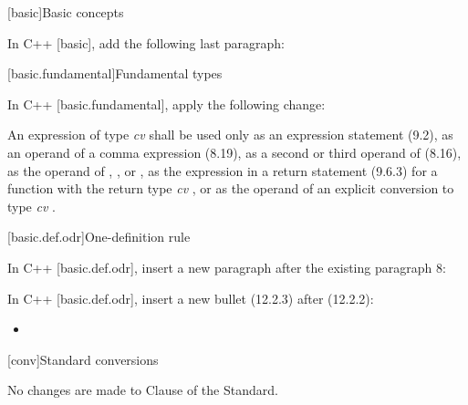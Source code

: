 
[basic]{Basic concepts}

\pnum
In C++ [basic], add the following last paragraph:

\begin{std.txt}
\end{std.txt}


[basic.fundamental]{Fundamental types}

\pnum
In C++ [basic.fundamental], apply the following change:

\begin{std.txt}
An expression of type \emph{cv}  shall be used only as an expression
statement (9.2), as an operand of a comma expression (8.19), as a second or
third operand of  (8.16), as the operand of ,
,  or , as the
expression in a return statement (9.6.3) for a function with the return type
\emph{cv} , or as the operand of an explicit conversion to type
\emph{cv} .
\end{std.txt}

[basic.def.odr]{One-definition rule}

\pnum
In C++ [basic.def.odr], insert a new paragraph after the existing paragraph 8:

\begin{std.txt}
\end{std.txt}

\pnum
In C++ [basic.def.odr], insert a new bullet (12.2.3) after (12.2.2):
\begin{std.txt}
\begin{itemize}
\item {}
\end{itemize}
\end{std.txt}

[conv]{Standard conversions}

No changes are made to Clause \the\value{chapter} of the \Cpp Standard.
